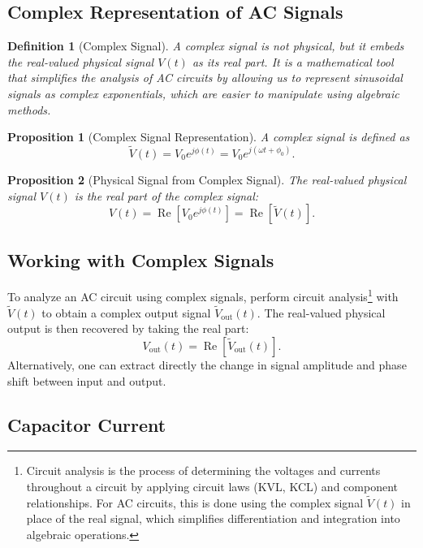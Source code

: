 \documentclass{article}
\newtheorem{definition}{Definition}
\newtheorem{proposition}{Proposition}
\begin{document}
\subsection{Complex Representation of AC Signals}
\begin{definition}[Complex Signal]
    A complex signal is not physical, but it embeds the real-valued physical signal $V(t)$ as its real part. It is a mathematical tool that simplifies the analysis of AC circuits by allowing us to represent sinusoidal signals as complex exponentials, which are easier to manipulate using algebraic methods.
\end{definition}
\begin{proposition}[Complex Signal Representation]
    A complex signal is defined as
    \[\tilde{V}(t) = V_0 e^{j\phi(t)} = V_0 e^{j(\omega t + \phi_0)}.\]
\end{proposition}
\begin{proposition}[Physical Signal from Complex Signal]
    The real-valued physical signal $V(t)$ is the real part of the complex signal:
    \[V(t) = \operatorname{Re}\!\left[V_0 e^{j\phi(t)}\right] = \operatorname{Re}\!\left[\tilde{V}(t)\right].\]
\end{proposition}

\subsection{Working with Complex Signals}

To analyze an AC circuit using complex signals, perform circuit analysis\footnote{Circuit analysis is the process of determining the voltages and currents throughout a circuit by applying circuit laws (KVL, KCL) and component relationships. For AC circuits, this is done using the complex signal $\tilde{V}(t)$ in place of the real signal, which simplifies differentiation and integration into algebraic operations.} with $\tilde{V}(t)$ to obtain a complex output signal $\tilde{V}_{\text{out}}(t)$. The real-valued physical output is then recovered by taking the real part:
\[V_{\text{out}}(t) = \operatorname{Re}\!\left[\tilde{V}_{\text{out}}(t)\right].\]
Alternatively, one can extract directly the change in signal amplitude and phase shift between input and output.

\subsection{Capacitor Current}
\end{document}
